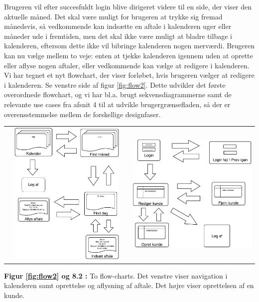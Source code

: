 \documentclass[12pt]{article}   %
\begin{document}
Brugeren vil efter succesfuldt login blive dirigeret videre til en side, der viser den aktuelle måned. Det skal være muligt for brugeren at trykke sig fremad månedsvis, så vedkommende kan indsætte en aftale i kalenderen uger eller måneder ude i fremtiden, men det skal ikke være muligt at bladre tilbage i kalenderen, eftersom dette ikke vil bibringe kalenderen nogen merværdi. Brugeren kan nu vælge mellem to veje: enten at tjekke kalenderen igennem uden at oprette eller aflyse nogen aftaler, eller vedkommende kan vælge at redigere i kalenderen. Vi har tegnet et nyt flowchart, der viser forløbet, hvis brugeren vælger at redigere i kalenderen. Se venstre side af figur \ref{fig:flow2}. Dette udvikler det første overordnede flowchart, og vi har bl.a. brugt sekvensdiagrammerne samt de relevante use cases fra afsnit 4 til at udvikle brugergrænsefladen, så der er overensstemmelse mellem de forskellige designfaser. \\


\begin{table}[ht]
\centering
\begin{tabular}{l | r}
\includegraphics[height=7cm,width=7cm]{flow2.pdf}
\label{fig:flow2}&
\includegraphics[height=7cm, width=7cm]{flow3.pdf}
\\
\end{tabular}
\label{tab:gt}
\end{table}
\begin{centering} \textbf{Figur \ref{fig:flow2} og 8.2 :} To flow-charts. Det venstre viser navigation i kalenderen samt oprettelse og aflysning af aftale. Det højre viser oprettelsen af en kunde. 
\end{centering}
\end{document}
